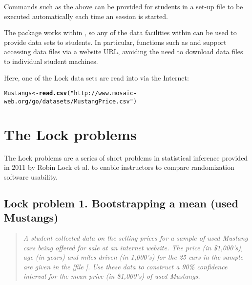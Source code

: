 \documentclass[11pt]{article}\usepackage[]{graphicx}\usepackage[]{color}
\makeatletter
\newcommand{\hlstr}[1]{\textcolor[rgb]{0.192,0.494,0.8}{#1}}%
\newcommand{\hlstd}[1]{\textcolor[rgb]{0.345,0.345,0.345}{#1}}%
\newcommand{\hlkwb}[1]{\textcolor[rgb]{0.69,0.353,0.396}{#1}}%
\newcommand{\hlkwd}[1]{\textcolor[rgb]{0.737,0.353,0.396}{\textbf{#1}}}%
\newenvironment{kframe}{%
 \def\at@end@of@kframe{}%
 \ifinner\ifhmode%
  \def\at@end@of@kframe{\end{minipage}}%
  \begin{minipage}{\columnwidth}%
 \fi\fi%
 \def\FrameCommand##1{\hskip\@totalleftmargin \hskip-\fboxsep
 \colorbox{shadecolor}{##1}\hskip-\fboxsep
     \hskip-\linewidth \hskip-\@totalleftmargin \hskip\columnwidth}%
 \MakeFramed {\advance\hsize-\width
   \@totalleftmargin\z@ \linewidth\hsize
   \@setminipage}}%
 {\par\unskip\endMakeFramed%
 \at@end@of@kframe}
\newenvironment{knitrout}{}{} %
\makeatother
\begin{document}
Commands such as the above can be provided for students in a set-up file to be
executed automatically each time an \R{} session is started.  

The  package works within \R{}, 
so any of the data facilities within \R{} can be used to
provide data sets to students.  In particular, \R{} functions 
such as  and  support 
accessing data files via a website URL, avoiding the need to download data 
files to individual student machines.  %

Here, one of the Lock data sets are read into \R{} via the Internet:
\begin{knitrout}
\color{fgcolor}\begin{kframe}
\begin{alltt}
\hlstd{Mustangs} \hlkwb{<-} \hlkwd{read.csv}\hlstd{(}\hlstr{"http://www.mosaic-web.org/go/datasets/MustangPrice.csv"}\hlstd{)}
\end{alltt}
\end{kframe}
\end{knitrout}

\section{The Lock problems}

The Lock problems are a series of short problems in statistical inference provided in 2011 by Robin Lock {et al.} to enable instructors to compare randomization software usability.

\subsection*{Lock problem 1. Bootstrapping a mean (used Mustangs)}

\begin{quotation}
 {\em A student collected data on the selling prices for a sample of used
  Mustang cars being offered for sale at an internet website. The
  price (in \$1,000's), age (in years) and miles driven (in 1,000's)
  for the 25 cars in the sample are given in the [file ].  
  Use these data to construct a 90\% confidence interval for the mean
  price (in \$1,000's) of used Mustangs.}
\end{quotation}
\end{document}
